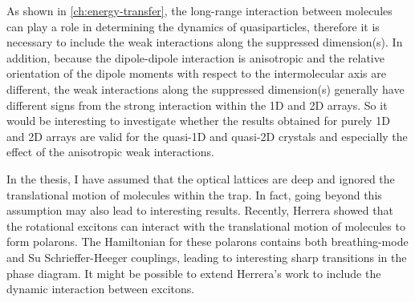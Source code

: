 As shown in \autoref{ch:energy-transfer}, the long-range interaction between molecules can play a role in determining
the dynamics of quasiparticles, therefore it is necessary to include the weak interactions along the suppressed dimension(s). 
In addition, because the dipole-dipole interaction is anisotropic and the relative orientation of the dipole moments with respect to the intermolecular axis are different, the weak interactions along the suppressed dimension(s) generally have different signs from the strong interaction within the 1D and 2D arrays. So it would be interesting to investigate whether the results obtained for purely 1D and 2D arrays are valid for the quasi-1D and quasi-2D crystals and especially the effect of 
the anisotropic weak interactions. 


 In the thesis, 
I have assumed that the optical lattices are deep and ignored the translational motion of molecules within the trap. In fact,
going beyond this assumption may also lead to interesting results. 
Recently, Herrera showed that the rotational excitons can interact with the translational motion of molecules to
form polarons\cite{felipe-polarons}. The Hamiltonian for these polarons contains both breathing-mode and 
Su Schrieffer-Heeger couplings, leading to interesting sharp transitions in the phase diagram\cite{felipe-arxive-polaron}. It might be possible to extend Herrera's work to include the dynamic interaction between excitons. 

